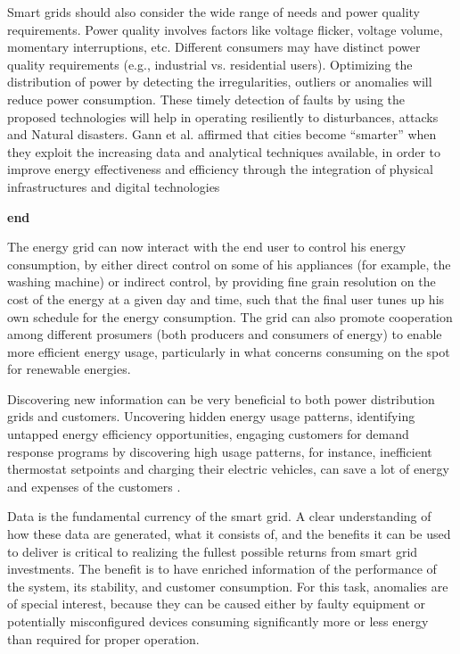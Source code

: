 Smart grids should also consider the wide range of needs and power quality requirements. Power quality involves factors like voltage flicker, voltage volume, momentary interruptions, etc. Different consumers may have distinct power quality requirements (e.g., industrial vs. residential users). Optimizing the distribution of power by detecting the irregularities, outliers or anomalies will reduce power consumption. These timely detection of faults by using the proposed technologies will help in operating resiliently to disturbances, attacks and Natural disasters. Gann et al.  affirmed that cities become “smarter” when they exploit the increasing data and analytical techniques available, in order to improve energy effectiveness and efficiency through the integration of physical infrastructures and digital technologies \cite{gann2011physical}

\textbf{end}


The energy grid can now interact with the end user to control his energy consumption, by either direct control on some of his appliances (for example, the washing machine) or indirect control, by providing fine grain resolution on the cost of the energy at a given day and time, such that the final user tunes up his own schedule for the energy consumption. The grid can also promote cooperation among different prosumers (both producers and consumers of energy) to enable more efficient energy usage, particularly in what concerns consuming on the spot for renewable energies.

Discovering new information can be very beneficial to both power distribution grids and customers. Uncovering hidden energy usage patterns, identifying untapped energy efficiency opportunities, engaging customers for demand response programs by discovering high usage patterns, for instance, inefficient thermostat setpoints and charging their electric vehicles, can save a lot of energy and expenses of the customers \cite{ben7utilities}. 


Data is the fundamental currency of the smart grid. A clear understanding of how these data are generated, what it consists of, and the benefits it can be used to deliver is critical to realizing the fullest possible returns from smart grid investments. The benefit is to have enriched information of the performance of the system, its stability, and customer consumption. For this task, anomalies are of special interest, because they can be caused either by faulty equipment or potentially misconfigured devices consuming significantly more or less energy than required for proper operation.


